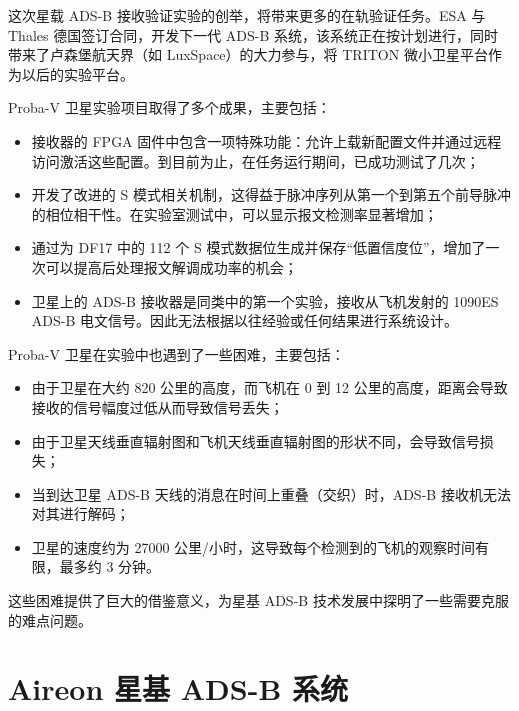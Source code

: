 这次星载 ADS-B 接收验证实验的创举，将带来更多的在轨验证任务。ESA 与 Thales 德国签订合同，开发下一代 ADS-B 系统，该系统正在按计划进行，同时带来了卢森堡航天界（如 LuxSpace）的大力参与，将 TRITON 微小卫星平台作为以后的实验平台。

Proba-V 卫星实验项目取得了多个成果，主要包括：

\begin{itemize}
    \item 接收器的 FPGA 固件中包含一项特殊功能：允许上载新配置文件并通过远程访问激活这些配置。到目前为止，在任务运行期间，已成功测试了几次；

    \item 开发了改进的 S 模式相关机制，这得益于脉冲序列从第一个到第五个前导脉冲的相位相干性。在实验室测试中，可以显示报文检测率显著增加；

    \item 通过为 DF17 中的 112 个 S 模式数据位生成并保存“低置信度位”，增加了一次可以提高后处理报文解调成功率的机会；

    \item 卫星上的 ADS-B 接收器是同类中的第一个实验，接收从飞机发射的 1090ES ADS-B 电文信号。因此无法根据以往经验或任何结果进行系统设计。
\end{itemize}

Proba-V 卫星在实验中也遇到了一些困难，主要包括：

\begin{itemize}
    \item 由于卫星在大约 820 公里的高度，而飞机在 0 到 12 公里的高度，距离会导致接收的信号幅度过低从而导致信号丢失；

    \item 由于卫星天线垂直辐射图和飞机天线垂直辐射图的形状不同，会导致信号损失；

    \item 当到达卫星 ADS-B 天线的消息在时间上重叠（交织）时，ADS-B 接收机无法对其进行解码；

    \item 卫星的速度约为 27000 公里/小时，这导致每个检测到的飞机的观察时间有限，最多约 3 分钟。
\end{itemize}

这些困难提供了巨大的借鉴意义，为星基 ADS-B 技术发展中探明了一些需要克服的难点问题。

\section{Aireon 星基 ADS-B 系统}

